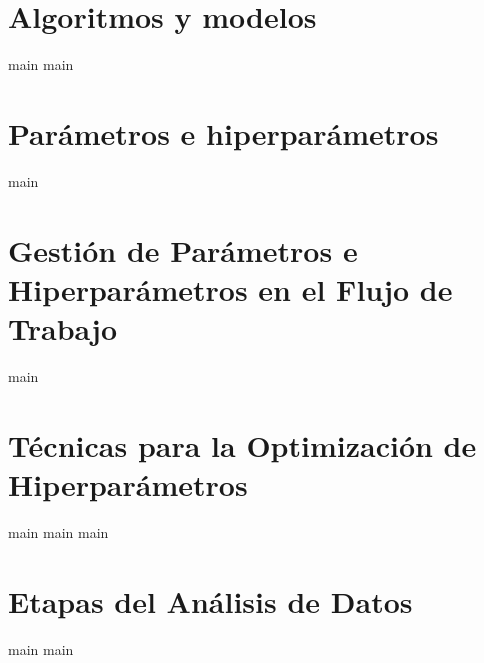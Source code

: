 \section{Algoritmos y modelos}
{main}
{main}
\section{Parámetros e hiperparámetros}
{main}
\section{Gestión de Parámetros e Hiperparámetros en el Flujo de Trabajo}
{main}
\section{Técnicas para la Optimización de Hiperparámetros}
{main}
{main}
{main}
\section{Etapas del Análisis de Datos}
{main}
{main}

